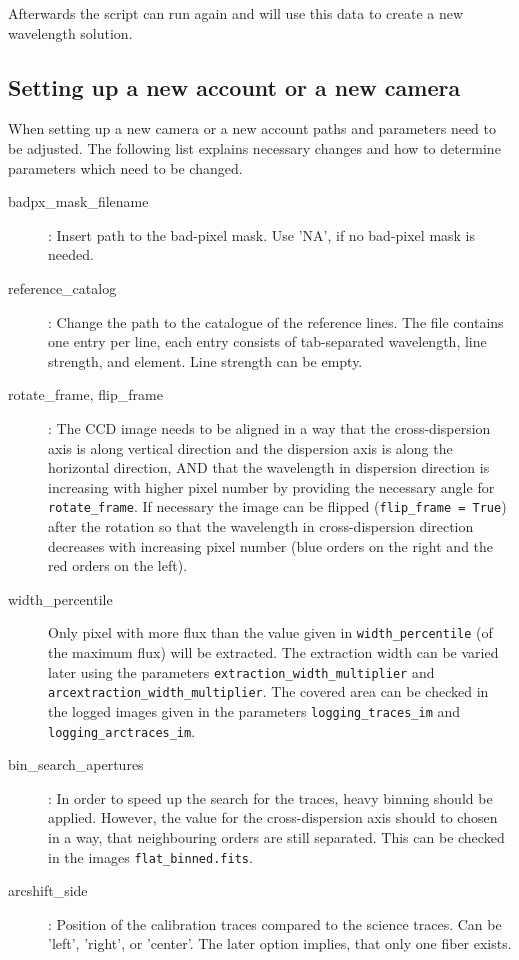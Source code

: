 \documentclass[10pt,a4paper]{article}
\begin{document}
Afterwards the script can run again and will use this data to create a new wavelength solution.


\subsection{Setting up a new account or a new camera}
When setting up a new camera or a new account paths and parameters need to be adjusted. The following list explains necessary changes and how to determine parameters which need to be changed.
\begin{description}
  \item[badpx\_mask\_filename] : Insert path to the bad-pixel mask. Use 'NA', if no bad-pixel mask is needed.
  \item[reference\_catalog] : Change the path to the catalogue of the reference lines. The file contains one entry per line, each entry consists of tab-separated wavelength, line strength, and element. Line strength can be empty.
  \item[rotate\_frame, flip\_frame] : The CCD image needs to be aligned in a way that the cross-dispersion axis is along vertical direction and the dispersion axis is along the horizontal direction, AND that the wavelength in dispersion direction is increasing with higher pixel number by providing the necessary angle for \verb|rotate_frame|. If necessary the image can be flipped (\verb|flip_frame = True|) after the rotation so that the wavelength in cross-dispersion direction decreases with increasing pixel number (blue orders on the right and the red orders on the left).
  \item[width\_percentile] Only pixel with more flux than the value given in \verb|width_percentile| (of the maximum flux) will be extracted. The extraction width can be varied later using the parameters \verb|extraction_width_multiplier| and \verb|arcextraction_width_multiplier|. The covered area can be checked in the logged images given in the parameters \verb|logging_traces_im| and \verb|logging_arctraces_im|. %
  \item[bin\_search\_apertures] : In order to speed up the search for the traces, heavy binning should be applied. However, the value for the cross-dispersion axis should to chosen in a way, that neighbouring orders are still separated. This can be checked in the images \verb|flat_binned.fits|.
  \item[arcshift\_side] : Position of the calibration traces compared to the science traces. Can be 'left', 'right', or 'center'. The later option implies, that only one fiber exists.

\end{description}
\end{document}
